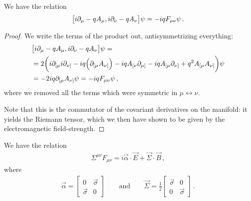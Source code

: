 \documentclass[main.tex]{subfiles}
\begin{document}
\begin{claim}
We have the relation 
%
\begin{align} \label{eq:antisymmetric-covariant-derivative-field-strength}
\qty[i \partial_{\mu } - q A_{\mu }, i \partial_{\nu } - q A_{\nu }] \psi 
= -iq F_{\mu \nu } \psi 
\,.
\end{align}
\end{claim}

\begin{proof}
We write the terms of the product out, antisymmetrizing everything: 
%
\begin{align}
&\qty[i \partial_{\mu } - q A_{\mu }, i \partial_{\nu } - q A_{\nu }] \psi = \\
&=2 \qty(i \partial_{[\mu }i \partial_{\nu ]}
- i q \qty(\partial_{[\mu } A_{\nu ]} ) 
-iq A_{[\nu } \partial_{\mu ]}
-iq A_{[\mu } \partial_{\nu ]}
+ q^2 A_{[\mu } A_{\nu ]}) \psi   \\
&= -2iq \partial_{[\mu } A_{\nu ]} \psi 
= -iq F_{\mu \nu } \psi 
\,,
\end{align}
%
where we removed all the terms which were symmetric in \(\mu \leftrightarrow \nu \). 

Note that this is the commutator of the covariant derivatives on the manifold: it yields the Riemann tensor, which we then have shown to be given by the electromagnetic field-strength.
\end{proof}

\begin{claim}
We have the relation 
%
\begin{align}
\Sigma^{\mu \nu }F_{\mu \nu }
=i \vec{\alpha} \cdot \vec{E} + \vec{\Sigma} \cdot \vec{B}
\,,
\end{align}
%
where 
%
\begin{align}
\vec{\alpha} = \left[\begin{array}{cc}
0 & \vec{\sigma} \\ 
\vec{\sigma} & 0
\end{array}\right] 
\qquad \text{and} \qquad
\vec{\Sigma} = \frac{1}{2} \left[\begin{array}{cc}
\vec{\sigma} & 0 \\ 
0 & \vec{\sigma}
\end{array}\right]
\,.
\end{align}
\end{claim}
\end{document}
